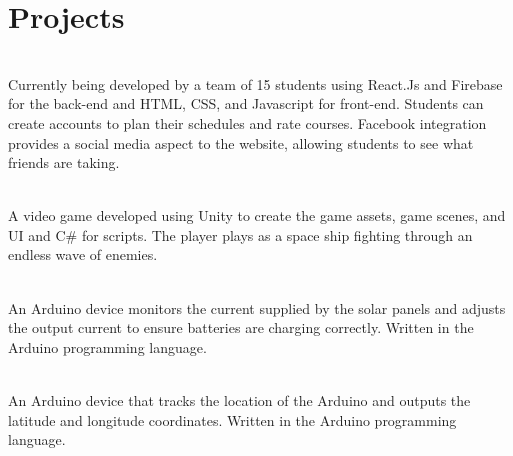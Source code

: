 \documentclass[]{Resume_template}
\begin{document}
\begin{minipage}[t]{0.66\textwidth}
\section{Projects}
\\
Currently being developed by a team of 15 students using React.Js and Firebase for the back-end and HTML, CSS, and Javascript for front-end. Students can create accounts to plan their schedules and rate courses. Facebook integration provides a social media aspect to the website, allowing students to see what friends are taking.

\sectionsep

\\
A video game developed using Unity to create the game assets, game scenes, and UI and C\# for scripts. The player plays as a space ship fighting through an endless wave of enemies.

\sectionsep

 \\
An Arduino device monitors the current supplied by the solar panels and adjusts the output current to ensure batteries are charging correctly. Written in the Arduino programming language.

\sectionsep

\\
An Arduino device that tracks the location of the Arduino and outputs the latitude and longitude coordinates. Written in the Arduino programming language.

\sectionsep

\end{minipage} 
\end{document}

